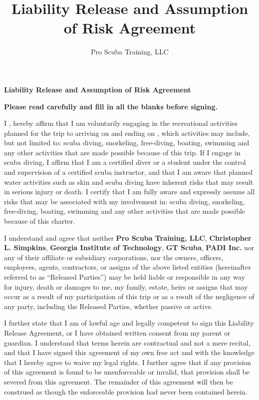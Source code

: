 \documentclass[11pt]{article}
\title{Liability Release and Assumption of Risk Agreement}
\author{Pro Scuba Training, LLC}
\date{}
\begin{document}

\begin{center}
{\Large {\bf Liability Release and Assumption of Risk Agreement}}\\
\end{center}

{\bf Please read carefully and fill in all the blanks before signing.}

I \makebox[3in]{\hrulefill} , hereby affirm that I am voluntarily engaging in the recreational activities planned for the trip to \underline{\hspace{2in}} arriving on \underline{\hspace{.75in}} and ending on \underline{\hspace{.75in}}, which activities may include, but not limited to: scuba diving, snorkeling, free-diving, boating, swimming and any other activities that are made possible because of this trip. If I engage in scuba diving, I affirm that I am a certified diver or a student under the control and supervision of a certified scuba instructor, and that I am aware that planned water activities such as skin and scuba diving have inherent risks that may result in serious injury or death. I certify that I am fully aware and expressly assume all risks that may be associated with my involvement in: scuba diving, snorkeling, free-diving, boating, swimming and any other activities that are made possible because of this charter.

I understand and agree that neither {\bf Pro Scuba Training, LLC}, {\bf Christopher L. Simpkins}, {\bf Georgia Institute of Technology}, {\bf GT Scuba}, {\bf PADI Inc.} nor any of their affiliate or subsidiary corporations, nor the owners, officers, employees, agents, contractors, or assigns of the above listed entities (hereinafter referred to as “Released Parties”) may be held liable or responsible in any way for injury, death or damages to me, my family, estate, heirs or assigns that may occur as a result of my participation of this trip or as a result of the negligence of any party, including the Released Parties, whether passive or active.

I further state that I am of lawful age and legally competent to sign this Liability Release Agreement, or I have obtained written consent from my parent or guardian. I understand that terms herein are contractual and not a mere recital, and that I have signed this agreement of my own free act and with the knowledge that I hereby agree to waive my legal rights. I further agree that if any provision of this agreement is found to be unenforceable or invalid, that provision shall be severed from this agreement. The remainder of this agreement will then be construed as though the enforceable provision had never been contained herein.
\end{document}
